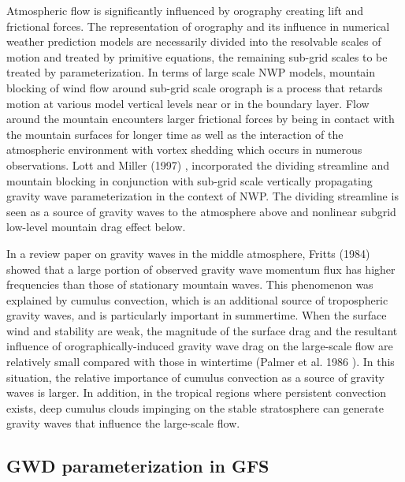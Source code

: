 Atmospheric flow is significantly influenced by orography creating lift and frictional forces. The representation of orography and its influence in numerical weather prediction models are necessarily divided into the resolvable scales of motion and treated by primitive equations, the remaining sub-\/grid scales to be treated by parameterization. In terms of large scale N\+WP models, mountain blocking of wind flow around sub-\/grid scale orograph is a process that retards motion at various model vertical levels near or in the boundary layer. Flow around the mountain encounters larger frictional forces by being in contact with the mountain surfaces for longer time as well as the interaction of the atmospheric environment with vortex shedding which occurs in numerous observations. Lott and Miller (1997) \cite{lott_and_miller_1997}, incorporated the dividing streamline and mountain blocking in conjunction with sub-\/grid scale vertically propagating gravity wave parameterization in the context of N\+WP. The dividing streamline is seen as a source of gravity waves to the atmosphere above and nonlinear subgrid low-\/level mountain drag effect below.

In a review paper on gravity waves in the middle atmosphere, Fritts (1984) \cite{fritts_1984} showed that a large portion of observed gravity wave momentum flux has higher frequencies than those of stationary mountain waves. This phenomenon was explained by cumulus convection, which is an additional source of tropospheric gravity waves, and is particularly important in summertime. When the surface wind and stability are weak, the magnitude of the surface drag and the resultant influence of orographically-\/induced gravity wave drag on the large-\/scale flow are relatively small compared with those in wintertime (Palmer et al. 1986 \cite{palmer_et_al_1986}). In this situation, the relative importance of cumulus convection as a source of gravity waves is larger. In addition, in the tropical regions where persistent convection exists, deep cumulus clouds impinging on the stable stratosphere can generate gravity waves that influence the large-\/scale flow.\hypertarget{group__gwd_outlines}{}\subsection{G\+W\+D parameterization in G\+FS}\label{group__gwd_outlines}

